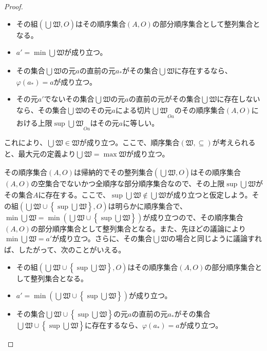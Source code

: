 \documentclass[dvipdfmx]{jsarticle}
\begin{document}
\begin{proof}
\begin{itemize}
\item
  その組$\left( \bigcup_{} \mathfrak{W},O \right)$はその順序集合$(A,O)$の部分順序集合として整列集合となる。
\item
  $a' = \min{\bigcup_{} \mathfrak{W}}$が成り立つ。
\item
  その集合$\bigcup_{} \mathfrak{W}$の元$a$の直前の元$a_{*}$がその集合$\bigcup_{} \mathfrak{W}$に存在するなら、$\varphi\left( a_{*} \right) = a$が成り立つ。
\item
  その元$a'$でないその集合$\bigcup_{} \mathfrak{W}$の元$a$の直前の元がその集合$\bigcup_{} \mathfrak{W}$に存在しないなら、その集合$\bigcup_{} \mathfrak{W}$のその元$a$による切片${\bigcup_{} \mathfrak{W}}_{Oa}$のその順序集合$(A,O)$における上限$\sup{\bigcup_{} \mathfrak{W}}_{Oa}$はその元$a$に等しい。
\end{itemize}
これにより、$\bigcup_{} \mathfrak{W}\in \mathfrak{W}$が成り立つ。ここで、順序集合$\left( \mathfrak{W, \subseteq} \right)$が考えられると、最大元の定義より$\bigcup_{} \mathfrak{W} = \max\mathfrak{W}$が成り立つ。\par
その順序集合$(A,O)$は帰納的でその整列集合$\left( \bigcup_{} \mathfrak{W},O \right)$はその順序集合$(A,O)$の空集合でないかつ全順序な部分順序集合なので、その上限$\sup{\bigcup_{} \mathfrak{W}}$がその集合$A$に存在する。ここで、$\sup{\bigcup_{} \mathfrak{W}} \notin \bigcup_{} \mathfrak{W}$が成り立つと仮定しよう。その組$\left( \bigcup_{} \mathfrak{W} \cup \left\{ \sup{\bigcup_{} \mathfrak{W}} \right\},O \right)$は明らかに順序集合で、$\min{\bigcup_{} \mathfrak{W}} = \min\left( \bigcup_{} \mathfrak{W} \cup \left\{ \sup{\bigcup_{} \mathfrak{W}} \right\} \right)$が成り立つので、その順序集合$(A,O)$の部分順序集合として整列集合となる。また、先ほどの議論により$\min{\bigcup_{} \mathfrak{W}} = a'$が成り立つ。さらに、その集合$\bigcup_{} \mathfrak{W}$の場合と同じように議論すれば、したがって、次のことがいえる。
\begin{itemize}
\item
  その組$\left( \bigcup_{} \mathfrak{W} \cup \left\{ \sup{\bigcup_{} \mathfrak{W}} \right\},O \right)$はその順序集合$(A,O)$の部分順序集合として整列集合となる。
\item
  $a' = \min\left( \bigcup_{} \mathfrak{W} \cup \left\{ \sup{\bigcup_{} \mathfrak{W}} \right\} \right)$が成り立つ。
\item
  その集合$\bigcup_{} \mathfrak{W} \cup \left\{ \sup{\bigcup_{} \mathfrak{W}} \right\}$の元$a$の直前の元$a_{*}$がその集合$\bigcup_{} \mathfrak{W} \cup \left\{ \sup{\bigcup_{} \mathfrak{W}} \right\}$に存在するなら、$\varphi\left( a_{*} \right) = a$が成り立つ。

\end{itemize}
\end{proof}
\end{document}

